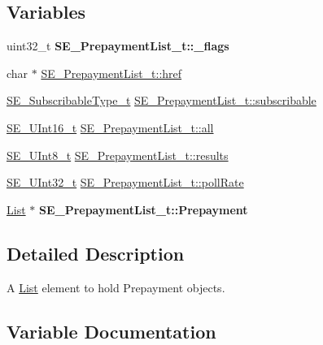 \subsection*{Variables}
\begin{DoxyCompactItemize}
\item 
\mbox{\label{group__PrepaymentList_ga0afa4209a595b1201f988b5de23da943}} 
uint32\+\_\+t {\bfseries S\+E\+\_\+\+Prepayment\+List\+\_\+t\+::\+\_\+flags}
\item 
char $\ast$ \hyperlink{group__PrepaymentList_gade40515dbf8f0153a026bc727070c5d6}{S\+E\+\_\+\+Prepayment\+List\+\_\+t\+::href}
\item 
\hyperlink{group__SubscribableType_ga5c41f553d369710ed34619266bf2551e}{S\+E\+\_\+\+Subscribable\+Type\+\_\+t} \hyperlink{group__PrepaymentList_ga164852891c027b156fae9dcb1228637d}{S\+E\+\_\+\+Prepayment\+List\+\_\+t\+::subscribable}
\item 
\hyperlink{group__UInt16_gac68d541f189538bfd30cfaa712d20d29}{S\+E\+\_\+\+U\+Int16\+\_\+t} \hyperlink{group__PrepaymentList_gabdbbcf75a3461d82f5322ddb66762a3c}{S\+E\+\_\+\+Prepayment\+List\+\_\+t\+::all}
\item 
\hyperlink{group__UInt8_gaf7c365a1acfe204e3a67c16ed44572f5}{S\+E\+\_\+\+U\+Int8\+\_\+t} \hyperlink{group__PrepaymentList_gae1c498eedbfe6cd548de3255354cb516}{S\+E\+\_\+\+Prepayment\+List\+\_\+t\+::results}
\item 
\hyperlink{group__UInt32_ga70bd4ecda3c0c85d20779d685a270cdb}{S\+E\+\_\+\+U\+Int32\+\_\+t} \hyperlink{group__PrepaymentList_gac66cf2fbf74ea3446a4efe5d6fdf47c9}{S\+E\+\_\+\+Prepayment\+List\+\_\+t\+::poll\+Rate}
\item 
\mbox{\label{group__PrepaymentList_ga91d5222ad536bab208ab01ff63f7657d}} 
\hyperlink{structList}{List} $\ast$ {\bfseries S\+E\+\_\+\+Prepayment\+List\+\_\+t\+::\+Prepayment}
\end{DoxyCompactItemize}


\subsection{Detailed Description}
A \hyperlink{structList}{List} element to hold Prepayment objects. 

\subsection{Variable Documentation}
\mbox{\label{group__PrepaymentList_gabdbbcf75a3461d82f5322ddb66762a3c}} 
